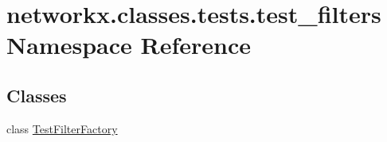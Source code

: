 \hypertarget{namespacenetworkx_1_1classes_1_1tests_1_1test__filters}{}\section{networkx.\+classes.\+tests.\+test\+\_\+filters Namespace Reference}
\label{namespacenetworkx_1_1classes_1_1tests_1_1test__filters}
\subsection*{Classes}
\begin{DoxyCompactItemize}
\item 
class \hyperlink{classnetworkx_1_1classes_1_1tests_1_1test__filters_1_1TestFilterFactory}{Test\+Filter\+Factory}
\end{DoxyCompactItemize}
